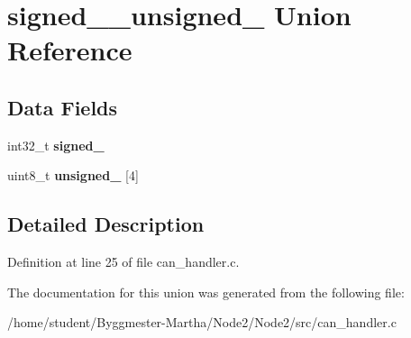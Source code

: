 \hypertarget{unionsigned__32__unsigned__8}{}\section{signed\+\_\+\_\+unsigned\+\_ Union Reference}
\label{unionsigned__32__unsigned__8}
\subsection*{Data Fields}
\begin{DoxyCompactItemize}
\item 
\mbox{\label{unionsigned__32__unsigned__8_a2c538f960108464d193432639858c705}} 
int32\+\_\+t {\bfseries signed\+\_}
\item 
\mbox{\label{unionsigned__32__unsigned__8_a26c51ac22b5d213858222becb22e2060}} 
uint8\+\_\+t {\bfseries unsigned\+\_} \mbox{[}4\mbox{]}
\end{DoxyCompactItemize}


\subsection{Detailed Description}


Definition at line 25 of file can\+\_\+handler.\+c.



The documentation for this union was generated from the following file\+:\begin{DoxyCompactItemize}
\item 
/home/student/\+Byggmester-\/\+Martha/\+Node2/\+Node2/src/can\+\_\+handler.\+c\end{DoxyCompactItemize}
